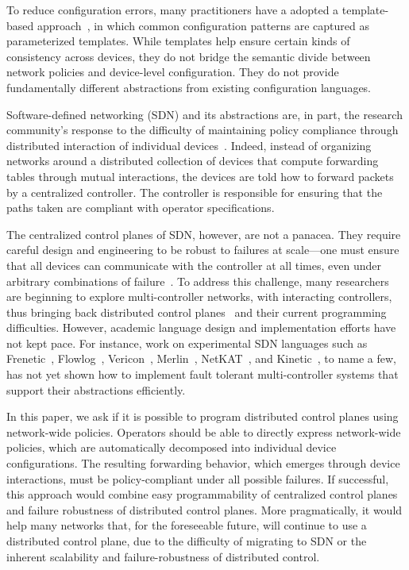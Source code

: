 To reduce configuration errors, many practitioners have a adopted a template-based
approach~\cite{hatch,thwack}, in which common configuration patterns are captured as parameterized templates.
 While templates help ensure certain kinds of consistency across devices, they do not
bridge the
semantic divide between network policies and device-level configuration.
They do not provide fundamentally different abstractions
from existing configuration languages.

Software-defined networking (SDN) and its abstractions 
are, in part, the research
community's response to the difficulty of maintaining policy
compliance through distributed interaction of individual
devices~\cite{sdn-languages}. Indeed, instead of organizing networks
around a distributed collection of devices that compute forwarding tables through
mutual interactions, the devices are told how to
forward packets by a centralized controller. The controller is responsible for ensuring that the
paths taken are compliant with operator specifications.

The centralized control planes of SDN, however, are not a panacea.
%
They require careful design and engineering to be robust to failures at scale---one must ensure that all devices can communicate with the controller at all times, even under arbitrary combinations of failure~\cite{x,y,z}. To address this challenge, many researchers are beginning to explore
multi-controller networks, with interacting controllers, thus bringing back distributed
control planes~\cite{x,y,z} and their current programming difficulties.  However, academic
language design and implementation efforts have not kept pace.  For instance, work on
experimental SDN languages
such as Frenetic~\cite{frenetic}, Flowlog~\cite{flowlog}, Vericon~\cite{vericon}, Merlin~\cite{merlin}, NetKAT~\cite{netkat}, and Kinetic~\cite{kinetic}, to
name a few, has not yet shown how to implement fault tolerant
multi-controller systems that support their abstractions efficiently.

In this paper, we ask if it is possible to program distributed control planes using network-wide policies.
Operators should be able to directly express network-wide policies, which are automatically decomposed into individual device configurations. The resulting forwarding behavior, which emerges through device interactions, must be policy-compliant under all possible failures.
If successful, this approach would combine easy programmability of centralized control planes and failure robustness of distributed control planes.
%
More pragmatically, it would help many networks that, for the foreseeable future, will continue to use a distributed control plane, due to the difficulty of migrating to SDN or the inherent scalability and failure-robustness of distributed control.

